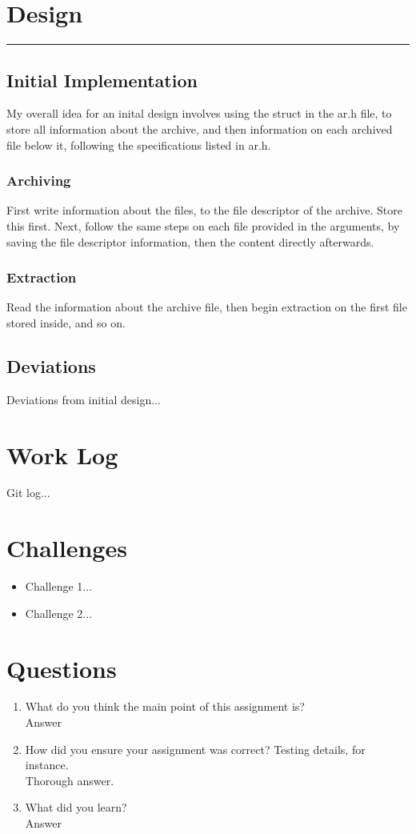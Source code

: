 \documentclass[fleqn,10pt,titlepage]{article}
\begin{document}
\section{Design}
\hrule
\subsection{Initial Implementation}
My overall idea for an inital design involves using the struct in the ar.h file, to store all information about the archive, and then 
information on each archived file below it, following the specifications listed in ar.h.
\subsubsection{Archiving}
First write information about the files, to the file descriptor of the archive. Store this first. Next, follow the same steps on each
file provided in the arguments, by saving the file descriptor information, then the content directly afterwards.

\subsubsection{Extraction}
Read the information about the archive file, then begin extraction on the first file stored inside, and so on.
\subsection{Deviations}
Deviations from initial design...
\clearpage

\section{Work Log}
Git log...
\clearpage

\section{Challenges}
\begin{itemize}
\item Challenge 1...
\item Challenge 2...
\end{itemize}
\clearpage

\section{Questions}
\begin{enumerate}
\item What do you think the main point of this assignment is? \\ Answer
\item How did you ensure your assignment was correct? Testing details, for instance. \\ Thorough answer.
\item What did you learn? \\ Answer
\end{enumerate}
\end{document}
